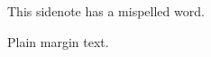 \documentclass{article}
\begin{document}
\begin{sidenote}
This sidenote has a mispelled word.
\end{sidenote}

\begin{margintext}
Plain margin text.
\end{margintext}

\end{document}
